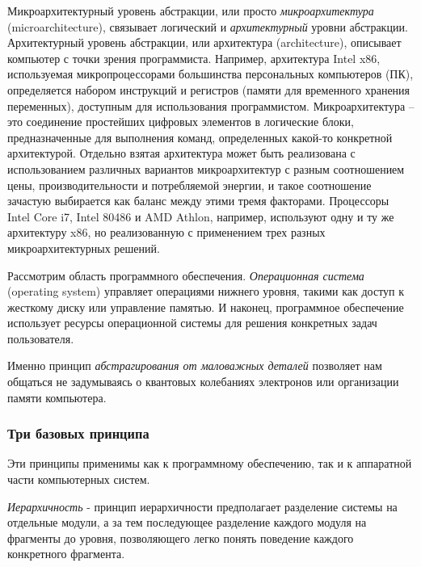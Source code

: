     \par Микроархитектурный уровень абстракции, или просто \textit{микроархитектура} (microarchitecture), связывает логический и \textit{архитектурный} уровни абстракции. Архитектурный уровень абстракции, или архитектура (architecture), описывает компьютер с точки зрения программиста. Например, архитектура Intel x86, используемая микропроцессорами большинства персональных компьютеров (ПК), определяется набором инструкций и регистров (памяти для временного хранения переменных), доступным для использования программистом. Микроархитектура – это соединение простейших цифровых элементов в логические блоки, предназначенные для выполнения команд, определенных какой-то конкретной архитектурой. Отдельно взятая архитектура может быть реализована с использованием различных вариантов микроархитектур с разным соотношением цены, производительности и потребляемой энергии, и такое соотношение зачастую выбирается как баланс между этими тремя факторами. Процессоры Intel Core i7, Intel 80486 и AMD Athlon, например, используют одну и ту же архитектуру x86, но реализованную с применением трех разных микроархитектурных решений.
    
    \par Рассмотрим область программного обеспечения. \textit{Операционная система} (operating system) управляет операциями нижнего уровня, такими как доступ к жесткому диску или управление памятью. И наконец, программное обеспечение использует ресурсы операционной системы для решения конкретных задач пользователя.
    
    \par Именно принцип \textit{абстрагирования от маловажных деталей} позволяет нам общаться не задумываясь о квантовых колебаниях электронов или организации памяти компьютера.
    
    \subsubsection{Три базовых принципа}
    
    \par Эти принципы применимы как к программному обеспечению, так и к аппаратной части компьютерных систем.
    
    \par \textit{Иерархичность} - принцип иерархичности предполагает разделение системы на отдельные модули, а за тем последующее разделение каждого модуля на фрагменты до уровня, позволяющего легко понять поведение каждого конкретного фрагмента.
    
